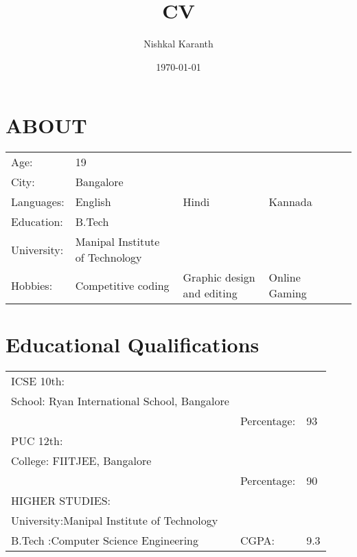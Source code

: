 \documentclass[a4paper,12pt]{article}
\begin{document}
      \title{CV}
      \maketitle
      \newpage
      \author{Nishkal Karanth}
      \date{\today}
      \section{ABOUT}
      \begin{tabular}{p{4cm}p{4cm}p{4cm}p{2cm}p{2cm}p{2cm}}
      Age: & 19 & & & & \\
     
      City: & Bangalore & & & & \\
     
      Languages: & English & Hindi & Kannada &&\\
     
      Education: & B.Tech & & & &\\
     
      University: & Manipal Institute of Technology & & & & \\
     
      Hobbies: & Competitive coding& Graphic design and editing& Online Gaming &&\\
     
      \end{tabular}
      \section{Educational Qualifications}
      \begin{tabular}{p{10cm}p{4cm}p{4cm}}
      ICSE 10th: & &  \\
      School: Ryan International School, Bangalore& &\\
      &Percentage:&93\\    
      PUC 12th: & &\\
      College: FIITJEE, Bangalore& &\\
      &Percentage: & 90 \\
      HIGHER STUDIES:& &\\
      University:Manipal Institute of Technology & &\\
      B.Tech :Computer Science Engineering & CGPA:&9.3 \\
     
      \end{tabular}
     
     
     
      
\end{document}
